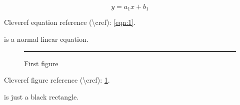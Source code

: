 \documentclass[11pt]{article}
\begin{document}
 
\begin{equation}
	y=a_1x+b_1\label{eqn:1}
\end{equation} 

Cleveref equation reference (\textbackslash cref): \cref{eqn:1}.

 is  a normal linear equation.
\begin{figure}[ht]
	\centering
	\rule{0.5\linewidth}{0.1\linewidth}
	\caption{First figure}\label{fig:1}
\end{figure}

Cleveref figure reference (\textbackslash cref): \cref{fig:1}.

 is just a black rectangle.
\end{document}
